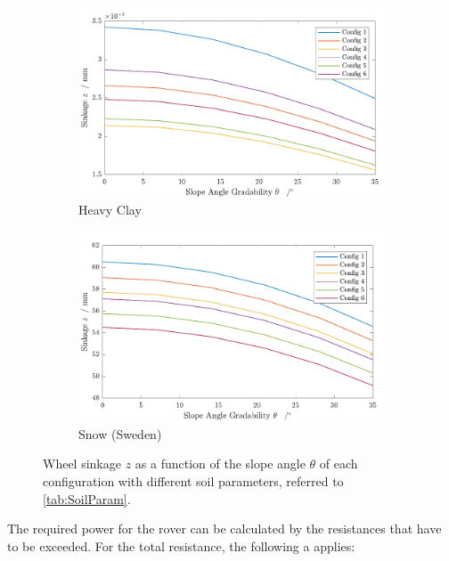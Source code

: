 \begin{figure}[htb]
     \centering
     \begin{subfigure}[b]{0.49\textwidth}
         \centering
         \includegraphics[width=\textwidth]{Media/Sinkage for each config in heavy clay.pdf}
         \caption{Heavy Clay}
     \end{subfigure}
     \hfill
     \begin{subfigure}[b]{0.49\textwidth}
         \centering
         \includegraphics[width=\textwidth]{Media/Sinkage for each config in snow (Sweden).pdf}
         \caption{Snow (Sweden)}
     \end{subfigure}
     \caption{Wheel sinkage \(z\) as a function of the slope angle \(\theta\) of each configuration with different soil parameters, referred to \autoref{tab:SoilParam}.}
     \label{fig:Sinkage}
\end{figure}

The required power for the rover can be calculated by the resistances that have to be exceeded. For the total resistance, the following a applies:

